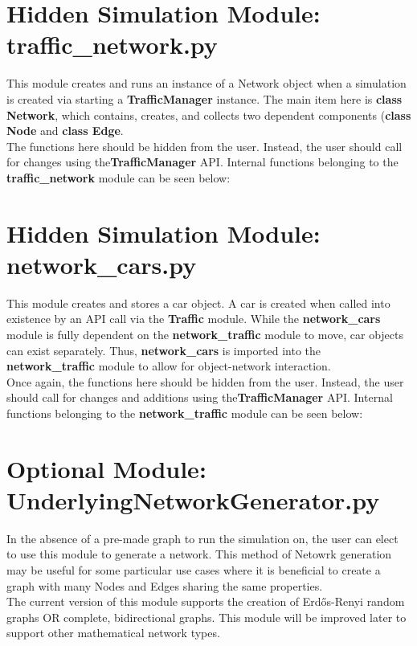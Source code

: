 \section{Hidden Simulation Module: traffic\_network.py}

This module creates and runs an instance of a Network object when a simulation is created via starting a \textbf{TrafficManager} instance.  The main item here is \textbf{class Network}, which  contains, creates, and collects two dependent components (\textbf{class Node} and \textbf{class Edge}.  \\

\noindent The functions here should be hidden from the user.  Instead, the user should call for changes using the\textbf{TrafficManager} API.  Internal functions belonging to the \textbf{traffic\_network} module can be seen below:

\section{Hidden Simulation Module: network\_cars.py}

\par This module creates and stores a car object.  A car is created when called into existence by an API call via the \textbf{Traffic} module.  While the \textbf{network\_cars} module is fully dependent on the \textbf{network\_traffic} module to move, car objects can exist separately.  Thus,  \textbf{network\_cars} is imported into the \textbf{network\_traffic} module to allow for object-network interaction. \\

\noindent Once again, the functions here should be hidden from the user.  Instead, the user should call for changes and additions using the\textbf{TrafficManager} API.  Internal functions belonging to the \textbf{network\_traffic} module can be seen below:


\section{Optional Module:  \\ UnderlyingNetworkGenerator.py}

In the absence of a pre-made graph to run the simulation on, the user can elect to use this module to generate a network.  This method of Netowrk generation may be useful for some particular use cases where it is beneficial to create a graph with many Nodes and Edges sharing the same properties.\\

\noindent The current version of this module supports the creation of Erdős-Renyi random graphs OR complete, bidirectional graphs.  This module will be improved later to support other mathematical network types.


